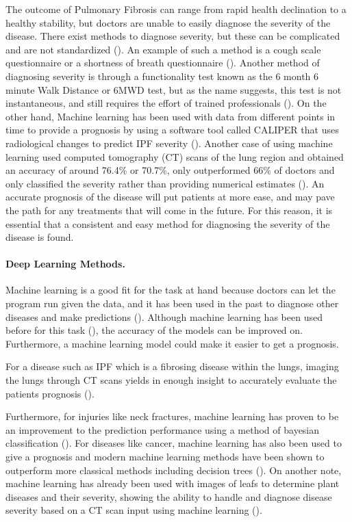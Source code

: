 \documentclass[12pt]{article}
\begin{document}
The outcome of Pulmonary Fibrosis can range from rapid health declination to a healthy stability, but doctors are unable to easily diagnose the severity of the disease. 
There exist methods to diagnose severity, but these can be complicated and are not standardized (\cite{robbie2017evaluating}). 
An example of such a method is a cough scale questionnaire or a shortness of breath questionnaire (\cite{robbie2017evaluating,king2014phase,van2016cough}).
Another method of diagnosing severity is through a functionality test known as the 6 month 6 minute Walk Distance or 6MWD test, but as the name suggests, this test is not instantaneous, and still requires the effort of trained professionals (\cite{robbie2017evaluating,du20146}).
On the other hand, Machine learning has been used with data from different points in time to provide a prognosis by using a software tool called CALIPER that uses radiological changes to predict IPF severity (\cite{maldonado2014automated}).
Another case of using machine learning used computed tomography (CT) scans of the lung region and obtained an accuracy of around 76.4\% or 70.7\%, only outperformed 66\% of doctors and only classified the severity rather than providing numerical estimates (\cite{walsh2018deep}).
An accurate prognosis of the disease will put patients at more ease, and may pave the path for any treatments that will come in the future. 
For this reason, it is essential that a consistent and easy method for diagnosing the severity of the disease is found.

\paragraph*{Deep Learning Methods.}

Machine learning is a good fit for the task at hand because doctors can let the program run given the data, and it has been used in the past to diagnose other diseases and make predictions (\cite{wang2010high}). 
Although machine learning has been used before for this task (\cite{robbie2017evaluating,du20146,maldonado2014automated}), the accuracy of the models can be improved on.
Furthermore, a machine learning model could make it easier to get a prognosis.

For a disease such as IPF which is a fibrosing disease within the lungs, imaging the lungs through CT scans yields in enough insight to accurately evaluate the patients prognosis (\cite{walsh2018role}).

Furthermore, for injuries like neck fractures, machine learning has proven to be an improvement to the prediction performance using a method of bayesian classification (\cite{kukar1996machine}).
For diseases like cancer, machine learning has also been used to give a prognosis and modern machine learning methods have been shown to outperform more classical methods including decision trees (\cite{cruz2006applications}).
On another note, machine learning has already been used with images of leafs to determine plant diseases and their severity, showing the ability to handle and diagnose disease severity based on a CT scan input using machine learning (\cite{mwebaze2016machine}).
\end{document}
